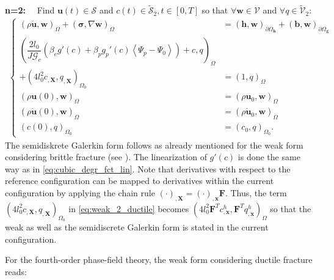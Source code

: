 \textbf{n=2:}$\quad$ Find $\mathbf{u}\left(t\right)\in\bm{\mathcal{S}}$ and $c\left(t\right)\in\tilde{\mathcal{S}}_{2},t\in\left[0,T\right]$ so that $\forall \mathbf{w}\in\bm{\mathcal{V}}$ and $\forall q\in\tilde{\mathcal{V}}_{2}$:
\begin{equation} \label{eq:weak_2_ductile}
\begin{aligned}
\left\{\begin{alignedat}{1}
	\left(\rho \ddot{\mathbf{u}},\mathbf{w}\right)_{\Omega} + \left(\bm{\sigma},\nabla\mathbf{w}\right)_{\Omega} &= \left(\mathbf{h},\mathbf{w}\right)_{\partial\Omega_{\mathbf{h}}} + \left(\mathbf{b},\mathbf{w}\right)_{\partial\Omega_{\mathbf{g}}} \\
	\left(\dfrac{2l_{0}}{J\mathcal{G}_{c}}\left(\beta_{e}g'\left(c\right)+\beta_{p}g_{p}'\left(c\right)\left<\Psi_{p}-\Psi_{0}\right>\right)+c,q\right)_{\Omega} & \\
	+\left(4l_{0}^{2} c_{,\mathbf{X}}, q_{,\mathbf{X}}\right)_{\Omega_{0}} &= \left(1,q\right)_{\Omega} \\
	\left(\rho\mathbf{u}\left(0\right),\mathbf{w}\right)_{\Omega} &= \left(\rho\mathbf{u}_{0},\mathbf{w}\right)_{\Omega} \\
	\left(\rho\dot{\mathbf{u}}\left(0\right),\mathbf{w}\right)_{\Omega} &= \left(\rho\dot{\mathbf{u}}_{0},\mathbf{w}\right)_{\Omega} \\
	\left(c\left(0\right),q\right)_{\Omega_{0}} &= \left(c_{0},q\right)_{\Omega_{0}}.
\end{alignedat}\right.
\end{aligned}
\end{equation}
The semidiskrete Galerkin form follows as already mentioned for the weak form considering brittle fracture (see ). The linearization of $g'\left(c\right)$ is done the same way as in \eqref{eq:cubic_degr_fct_lin}. Note that derivatives with respect to the reference configuration can be mapped to derivatives within the current configuration by applying the chain rule $\left(\cdot\right)_{,\mathbf{X}}=\left(\cdot\right)_{,\mathbf{x}}\mathbf{F}$. Thus, the term $\left(4l_{0}^{2} c_{,\mathbf{X}}, q_{,\mathbf{X}}\right)_{\Omega_{0}}$ in \eqref{eq:weak_2_ductile} becomes $\left(4l_{0}^{2} \mathbf{F}^{T}c_{,\mathbf{x}}^{h}, \mathbf{F}^{T}q_{,\mathbf{x}}^{h}\right)_{\Omega}$ so that the weak as well as the semidiscrete Galerkin form is stated in the current configuration.

For the fourth-order phase-field theory, the weak form considering ductile fracture reads:

